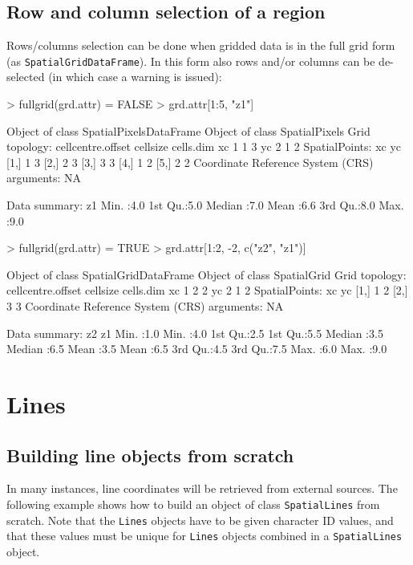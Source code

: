 \documentclass{article}
\begin{document}
\subsection{Row and column selection of a region}
Rows/columns selection can be done when gridded data is in the full grid
form (as {\tt SpatialGridDataFrame}). In this form also rows and/or columns
can be de-selected (in which case a warning is issued):
\begin{Schunk}
\begin{Sinput}
> fullgrid(grd.attr) = FALSE
> grd.attr[1:5, "z1"]
\end{Sinput}
\begin{Soutput}
Object of class SpatialPixelsDataFrame
Object of class SpatialPixels
Grid topology:
   cellcentre.offset cellsize cells.dim
xc                 1        1         3
yc                 2        1         2
SpatialPoints:
     xc yc
[1,]  1  3
[2,]  2  3
[3,]  3  3
[4,]  1  2
[5,]  2  2
Coordinate Reference System (CRS) arguments: NA 

Data summary:
       z1     
 Min.   :4.0  
 1st Qu.:5.0  
 Median :7.0  
 Mean   :6.6  
 3rd Qu.:8.0  
 Max.   :9.0  

\end{Soutput}
\begin{Sinput}
> fullgrid(grd.attr) = TRUE
> grd.attr[1:2, -2, c("z2", "z1")]
\end{Sinput}
\begin{Soutput}
Object of class SpatialGridDataFrame
Object of class SpatialGrid
Grid topology:
   cellcentre.offset cellsize cells.dim
xc                 1        2         2
yc                 2        1         2
SpatialPoints:
     xc yc
[1,]  1  2
[2,]  3  3
Coordinate Reference System (CRS) arguments: NA 

Data summary:
       z2            z1     
 Min.   :1.0   Min.   :4.0  
 1st Qu.:2.5   1st Qu.:5.5  
 Median :3.5   Median :6.5  
 Mean   :3.5   Mean   :6.5  
 3rd Qu.:4.5   3rd Qu.:7.5  
 Max.   :6.0   Max.   :9.0  

\end{Soutput}
\end{Schunk}

\section{Lines}

\subsection{Building line objects from scratch}
In many instances, line coordinates will be retrieved from external
sources.  The following example shows how to build an object of class
{\tt SpatialLines} from scratch. Note that the {\tt Lines} objects have to be given character ID values, and that these values must be unique for {\tt Lines} objects combined in a {\tt SpatialLines} object.
\end{document}

